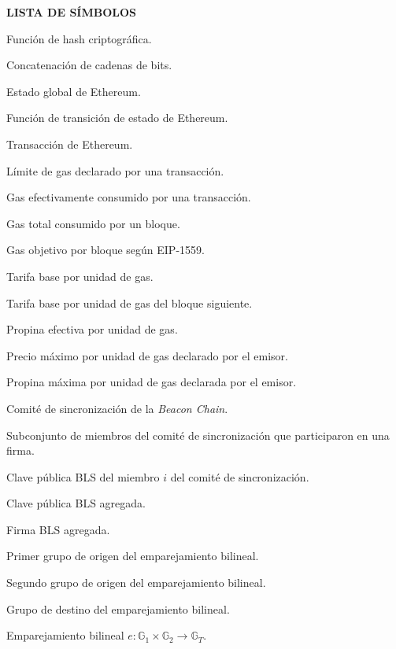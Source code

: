 \noindent
\textbf{\large LISTA DE SÍMBOLOS}

\begin{listsymbol}
	\item[$H$] Función de hash criptográfica.
	\item[$\Vert$] Concatenación de cadenas de bits.
	\item[$\sigma$] Estado global de Ethereum.
	\item[$\Upsilon$] Función de transición de estado de Ethereum.
	\item[$T$] Transacción de Ethereum.
	\item[$g_{\mathrm{lim}}$] Límite de gas declarado por una transacción.
	\item[$g_{\mathrm{usado}}$] Gas efectivamente consumido por una transacción.
	\item[$g_{\mathrm{bloque}}$] Gas total consumido por un bloque.
	\item[$g_{\mathrm{obj}}$] Gas objetivo por bloque según EIP-1559.
	\item[$p_{\mathrm{base}}$] Tarifa base por unidad de gas.
	\item[$p'_{\mathrm{base}}$] Tarifa base por unidad de gas del bloque siguiente.
	\item[$p_{\mathrm{prop}}$] Propina efectiva por unidad de gas.
	\item[$p_{\max}$] Precio máximo por unidad de gas declarado por el emisor.
	\item[$p^{\mathrm{prop}}_{\max}$] Propina máxima por unidad de gas declarada por el emisor.
	\item[$\mathcal{C}$] Comité de sincronización de la \textit{Beacon Chain}.
	\item[$\mathcal{C}'$] Subconjunto de miembros del comité de sincronización que participaron en una firma.
	\item[$\mathit{pk}_i$] Clave pública BLS del miembro $i$ del comité de sincronización.
	\item[$\mathit{pk}_{\mathrm{agg}}$] Clave pública BLS agregada.
	\item[$\mathit{sig}$] Firma BLS agregada.
	\item[$\mathbb{G}_1$] Primer grupo de origen del emparejamiento bilineal.
	\item[$\mathbb{G}_2$] Segundo grupo de origen del emparejamiento bilineal.
	\item[$\mathbb{G}_T$] Grupo de destino del emparejamiento bilineal.
	\item[$e$] Emparejamiento bilineal $e\colon \mathbb{G}_1 \times \mathbb{G}_2 \to \mathbb{G}_T$.

\end{listsymbol}
